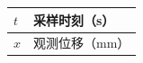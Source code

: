 {\centering\songti{}
\renewcommand\arraystretch{1.35}
\begin{tabularx}{\textwidth}{|>{\centering\arraybackslash}p{}|>{\raggedright\arraybackslash}X|}
\hline
$t$ & 采样时刻（\unit{\second}）\\\hline
$x$ & 观测位移（\unit{\milli\metre}）\\\hline
\end{tabularx}\par}
